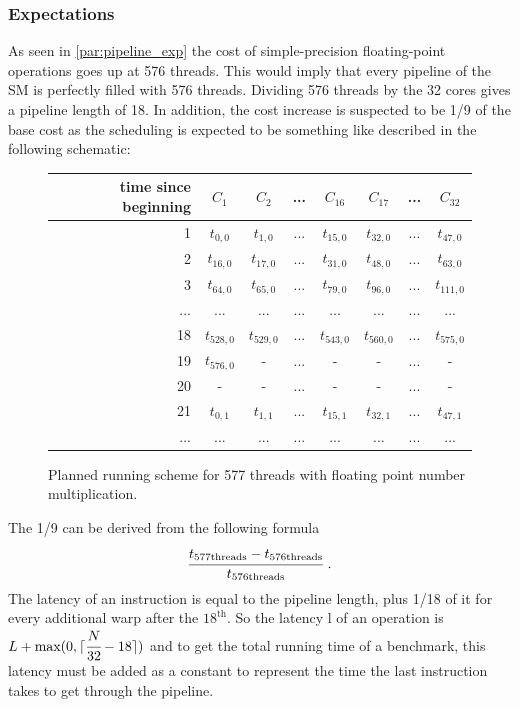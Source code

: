 \documentclass{report}
\DeclarePairedDelimiter\ceil{\lceil}{\rceil}
\begin{document}
	\subsubsection{Expectations}
	As seen in \ref{par:pipeline_exp} the cost of simple-precision floating-point
    operations goes up at 576 threads. This would imply that every pipeline of
    the SM is perfectly filled with 576 threads. Dividing 576 threads by
    the 32 cores gives a pipeline length of 18. In addition, the cost increase
    is suspected to be 1/9 of the base cost as the scheduling is expected to be
    something like described in the following schematic:
    
    \begin{figure}[H]
      \centering
       \begin{tabular}{ | r || c | c | c | c || c | c | c | }
    	    \hline
    	    time since beginning & $C_1$ & $C_2$ & ... & $C_{16}$ & $C_{17}$ & ... & $C_{32}$ \\ \hline  \hline
    	   1 & $t_{0,0}$ & $t_{1,0}$ & ... & $t_{15,0}$ & $t_{32, 0}$ & ... & $t_{47, 0}$ \\ \hline 
    	   2 & $t_{16,0}$ & $t_{17,0}$ & ... & $t_{31,0}$ & $t_{48, 0}$ & ... & $t_{63, 0}$ \\ \hline
    	   3 & $t_{64,0}$ & $t_{65,0}$ & ... & $t_{79,0}$ & $t_{96, 0}$ & ... & $t_{111, 0}$ \\ \hline
    	   ... & ... & ... & ... & ... & ... & ... & ... \\ \hline
    	   18 & $t_{528,0}$ & $t_{529,0}$ & ... & $t_{543,0}$ & $t_{560,0}$ & ... & $t_{575, 0}$ \\ \hline
    	   19 & $t_{576,0}$ & - & ... & - & - & ... & - \\ \hline
    	   20 & - & - & ... & - & - & ... & - \\ \hline
    	   21 & $t_{0,1}$ & $t_{1,1}$ & ... & $t_{15,1}$ & $t_{32,1}$ & ... & $t_{47,1}$ \\ \hline
    	   ... & ... & ... & ... & ... & ... & ... & ... \\ \hline
  	\end{tabular}
  	\captionsetup{justification=centering}
  	\caption{Planned running scheme for 577 threads with floating point number multiplication.}
  	\label{fig:fp_prediction_513}
   \end{figure}

    The 1/9 can be derived from the following formula
    \[ \cfrac{t_{\text{577threads}} - t_{\text{576threads}}}{t_{\text{576threads}}} \text{  .}\]
    The latency of an instruction is equal to the pipeline length, plus 1/18 of
    it for every additional warp after the $18^{\text{th}}$. So the latency l of an 
    operation is $L + \text{max}(0, \ceil{\cfrac{N}{32} -18})$ and to get the total
    running time of a benchmark, this latency must be added as a constant to
    represent the time the last instruction takes to get through the pipeline.
\end{document}
